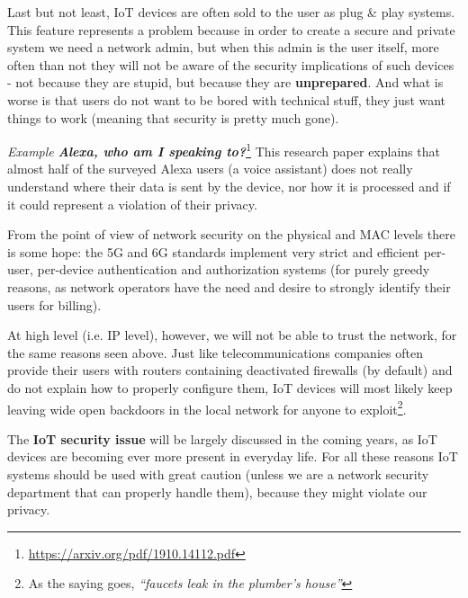 \vspace{0.5em}

Last but not least, IoT devices are often sold to the user as plug \& play systems. This feature represents a problem because in order to create a secure and private system we need a network admin, but when this admin is the user itself, more often than not they will not be aware of the security implications of such devices - not because they are stupid, but because they are \textbf{unprepared}. And what is worse is that users do not want to be bored with technical stuff, they just want things to work (meaning that security is pretty much gone).

\vspace{0.5em}

\emph{Example} \textbf{\textit{Alexa, who am I speaking to?}}\footnote{\url{ https://arxiv.org/pdf/1910.14112.pdf}}
This research paper explains that almost half of the surveyed Alexa users (a voice assistant) does not really understand where their data is sent by the device, nor how it is processed and if it could represent a violation of their privacy.

\vspace{0.5em}

From the point of view of network security on the physical and MAC levels there is some hope: the 5G and 6G standards implement very strict and efficient per-user, per-device authentication and authorization systems (for purely greedy reasons, as network operators have the need and desire to strongly identify their users for billing).

At high level (i.e. IP level), however, we will not be able to trust the network, for the same reasons  seen above. Just like telecommunications companies often provide their users with routers containing deactivated firewalls (by default) and do not explain how to properly configure them, IoT devices will most likely keep leaving wide open backdoors in the local network for anyone to exploit\footnote{As the saying goes, \textit{“faucets leak in the plumber’s house”}}.

The \textbf{IoT security issue} will be largely discussed in the coming years, as IoT devices are becoming ever more present in everyday life. For all these reasons IoT systems should be used with great caution (unless we are a network security department that can properly handle them), because they might violate our privacy.


